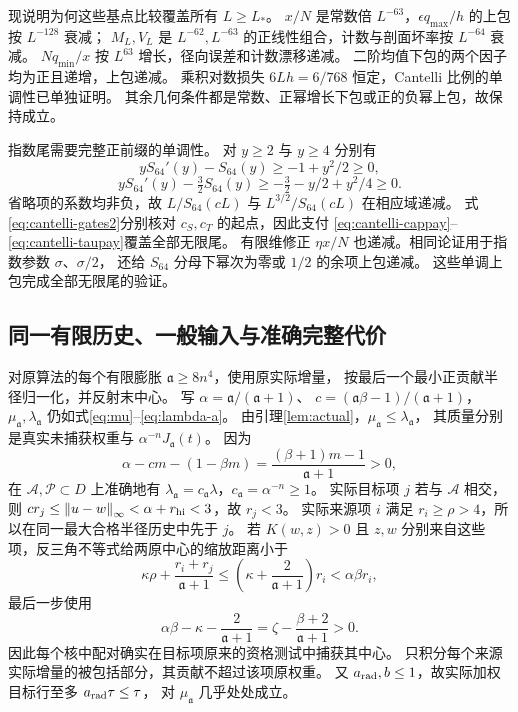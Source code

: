 \documentclass[UTF8,a4paper,11pt,fontset=fandol]{ctexart}
\theoremstyle{remark}
\newcommand{\norm}[1]{\left\lVert#1\right\rVert}
\begin{document}
现说明为何这些基点比较覆盖所有 $L\ge L_*$。
$x/N$ 是常数倍 $L^{-63}$，$\epsilon q_{\max}/h$ 的上包按 $L^{-128}$ 衰减；
$M_L,V_L$ 是 $L^{-62},L^{-63}$ 的正线性组合，计数与剖面坏率按 $L^{-64}$ 衰减。
$Nq_{\min}/x$ 按 $L^{63}$ 增长，径向误差和计数漂移递减。
二阶均值下包的两个因子均为正且递增，上包递减。
乘积对数损失 $6Lh=6/768$ 恒定，Cantelli 比例的单调性已单独证明。
其余几何条件都是常数、正幂增长下包或正的负幂上包，故保持成立。

指数尾需要完整正前缀的单调性。
对 $y\ge2$ 与 $y\ge4$ 分别有
\[
 yS_{64}'(y)-S_{64}(y)\ge-1+y^2/2\ge0,
\]
\[
 yS_{64}'(y)-\tfrac32S_{64}(y)
 \ge-\tfrac32-y/2+y^2/4\ge0.
\]
省略项的系数均非负，故 $L/S_{64}(cL)$ 与 $L^{3/2}/S_{64}(cL)$ 在相应域递减。
式\eqref{eq:cantelli-gates2}分别核对 $c_S,c_T$ 的起点，因此支付
\eqref{eq:cantelli-cappay}--\eqref{eq:cantelli-taupay}覆盖全部无限尾。
有限维修正 $\eta x/N$ 也递减。相同论证用于指数参数 $\sigma$、$\sigma/2$，
还给 $S_{64}$ 分母下幂次为零或 $1/2$ 的余项上包递减。
这些单调上包完成全部无限尾的验证。

\subsection{同一有限历史、一般输入与准确完整代价}\label{subsec:cantelli-finish}
对原算法的每个有限膨胀 $\mathfrak a\ge8n^4$，使用原实际增量，
按最后一个最小正贡献半径归一化，并反射末中心。
写 $\alpha=\mathfrak a/(\mathfrak a+1)$、
$c=(\mathfrak a\beta-1)/(\mathfrak a+1)$，
$\mu_{\mathfrak a},\lambda_{\mathfrak a}$ 仍如式\eqref{eq:mu}--\eqref{eq:lambda-a}。
由引理\ref{lem:actual}，$\mu_{\mathfrak a}\le\lambda_{\mathfrak a}$，
其质量分别是真实未捕获权重与 $\alpha^{-n}J_{\mathfrak a}(t)$。
因为
\[
 \alpha-cm-(1-\beta m)=\frac{(\beta+1)m-1}{\mathfrak a+1}>0,
\]
在 $\mathcal A,\mathcal P\subset D$ 上准确地有
$\lambda_{\mathfrak a}=c_{\mathfrak a}\lambda$，$c_{\mathfrak a}=\alpha^{-n}\ge1$。
实际目标项 $j$ 若与 $\mathcal A$ 相交，则
$cr_j\le\norm{u-w}_\infty<\alpha+r_{\rm hi}<3$，故 $r_j<3$。
实际来源项 $i$ 满足 $r_i\ge\rho>4$，所以在同一最大合格半径历史中先于 $j$。
若 $K(w,z)>0$ 且 $z,w$ 分别来自这些项，反三角不等式给两原中心的缩放距离小于
\[
 \kappa\rho+\frac{r_i+r_j}{\mathfrak a+1}
 \le\left(\kappa+\frac2{\mathfrak a+1}\right)r_i
 <\alpha\beta r_i,
\]
最后一步使用
\[
 \alpha\beta-\kappa-\frac2{\mathfrak a+1}
 =\zeta-\frac{\beta+2}{\mathfrak a+1}>0.
\]
因此每个核中配对确实在目标项原来的资格测试中捕获其中心。
只积分每个来源实际增量的被包括部分，其贡献不超过该项原权重。
又 $a_{\rm rad},b\le1$，故实际加权目标行至多 $a_{\rm rad}\tau\le\tau$，
对 $\mu_{\mathfrak a}$ 几乎处处成立。
\end{document}

